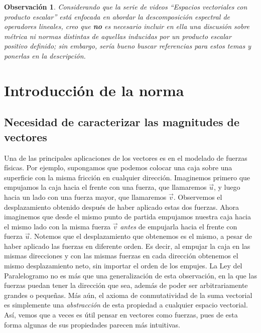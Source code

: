 \documentclass[12pt,dvipsnames]{article}
\newtheorem{obs}{Observación}[section]
\numberwithin{equation}{section}
\begin{document}
\begin{obs}
Considerando que la serie de videos ``Espacios vectoriales con producto escalar'' está enfocada en abordar la descomposición espectral de operadores lineales, creo que \textbf{no} es necesario incluir en ella una discusión sobre métrica ni normas distintas de aquellas inducidas por un producto escalar positivo definido; sin embargo, sería bueno buscar referencias para estos temas y ponerlas en la descripción.
\end{obs}


\newpage
\section{Introducción de la norma}

\subsection{Necesidad de caracterizar las magnitudes de vectores}

Una de las principales aplicaciones de los vectores es en el modelado de fuerzas físicas. Por ejemplo, supongamos que podemos colocar una caja sobre una superficie con la misma fricción en cualquier dirección. Imaginemos primero que empujamos la caja hacia el frente con una fuerza, que llamaremos $\vec{u}$, y luego hacia un lado con una fuerza mayor, que llamaremos $\vec{v}$. Observemos el desplazamiento obtenido después de haber aplicado estas dos fuerzas. Ahora imaginemos que desde el mismo punto de partida empujamos nuestra caja hacia el mismo lado con la misma fuerza $\vec{v}$ \emph{antes} de empujarla hacia el frente con fuerza $\vec{u}$. Notemos que el desplazamiento que obtenemos es el mismo, a pesar de haber aplicado las fuerzas en diferente orden. Es decir, al empujar la caja en las mismas direcciones y con las mismas fuerzas en cada dirección obtenemos el mismo desplazamiento neto, sin importar el orden de los empujes. La Ley del Paralelogramo no es más que una generalización de esta observación, en la que las fuerzas puedan tener la dirección que sea, además de poder ser arbitrariamente grandes o pequeñas. Más aún, el axioma de conmutatividad de la suma vectorial es simplemente una \emph{abstracción} de esta propiedad a cualquier espacio vectorial. Así, vemos que a veces es útil pensar en vectores como fuerzas, pues de esta forma algunas de sus propiedades parecen más intuitivas. 
\end{document}
